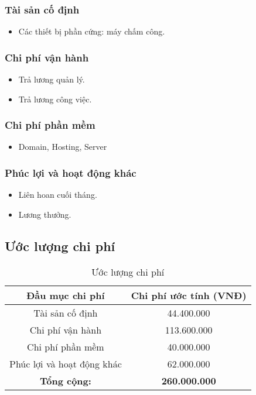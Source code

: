 \subsubsection{Tài sản cố định}
\begin{itemize}
    \item Các thiết bị phần cứng: máy chấm công.
\end{itemize}

\subsubsection{Chi phí vận hành}
\begin{itemize}
    \item Trả lương quản lý.
    \item Trả lương công việc.
\end{itemize}

\subsubsection{Chi phí phần mềm}
\begin{itemize}
    \item Domain, Hosting, Server
\end{itemize}

\subsubsection{Phúc lợi và hoạt động khác}
\begin{itemize}
    \item Liên hoan cuối tháng.
    \item Lương thưởng.
\end{itemize}

\subsection{Ước lượng chi phí}
\begin{table}[H]
    \caption{Ước lượng chi phí}
    \centering
    \renewcommand{\arraystretch}{1.5} %
    \begin{tabular}{|c|c|}
        \hline
        \textbf{Đầu mục chi phí}                  & \textbf{Chi phí ước tính (VNĐ)} \\
        \hline
        Tài sản cố định                           & 44.400.000                      \\
        \hline
        Chi phí vận hành                          & 113.600.000                     \\
        \hline
        Chi phí phần mềm                          & 40.000.000                      \\
        \hline
        Phúc lợi và hoạt động khác                & 62.000.000                      \\
        \hline
        \multicolumn{1}{|c|}{\textbf{Tổng cộng:}} & \textbf{260.000.000}            \\
        \hline
    \end{tabular}
\end{table}

